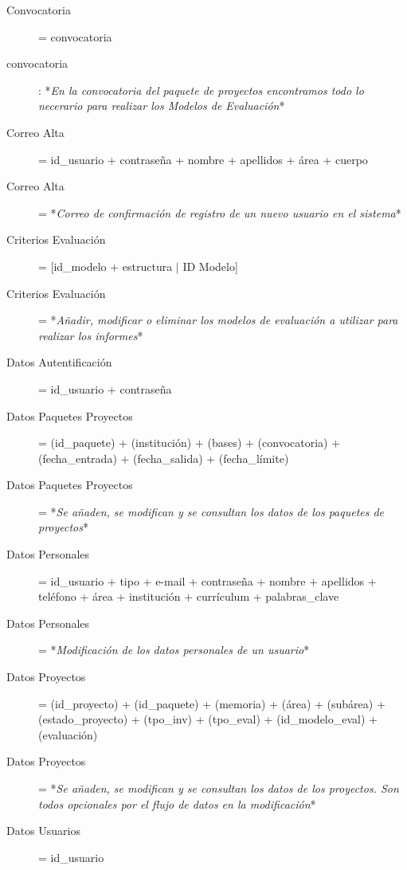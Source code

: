 \documentclass[12pt,a4paper,spanish,twoside]{book}
\begin{document}
\begin{description}
\item[Convocatoria] = convocatoria

\item[convocatoria]: *\emph{En la convocatoria del paquete de proyectos
    encontramos todo lo necerario para realizar los Modelos de Evaluación}* 

\item[Correo Alta] = id\_usuario + contraseña + nombre + apellidos + área +
  cuerpo 

\item[Correo Alta] = *\emph{Correo de confirmación de registro de un nuevo
    usuario en el sistema}* 

\item[Criterios Evaluación] = [id\_modelo + estructura $\mid$ ID Modelo]

\item[Criterios Evaluación] = *\emph{Añadir, modificar o eliminar los modelos
    de evaluación a utilizar para realizar los informes}* 

\item[Datos Autentificación] = id\_usuario + contraseña

\item[Datos Paquetes Proyectos] = (id\_paquete) + (institución) + (bases) +
  (convocatoria) + (fecha\_entrada) + (fecha\_salida) + (fecha\_límite) 

\item[Datos Paquetes Proyectos] = *\emph{Se añaden, se modifican y se
    consultan los datos de los paquetes de proyectos}* 

\item[Datos Personales] = id\_usuario + tipo + e-mail + contraseña + nombre +
  apellidos + teléfono + área + institución + currículum + palabras\_clave 

\item[Datos Personales] = *\emph{Modificación de los datos personales de un
    usuario}* 

\item[Datos Proyectos] = (id\_proyecto) + (id\_paquete) + (memoria) + (área)
  + (subárea) + (estado\_proyecto) + (tpo\_inv) + (tpo\_eval) +
  (id\_modelo\_eval) + (evaluación) 

\item[Datos Proyectos] = *\emph{Se añaden, se modifican y se consultan los
    datos de los proyectos. Son todos opcionales por el flujo de datos en la
    modificación}* 

\item[Datos Usuarios] = id\_usuario


\end{description}
\end{document}
